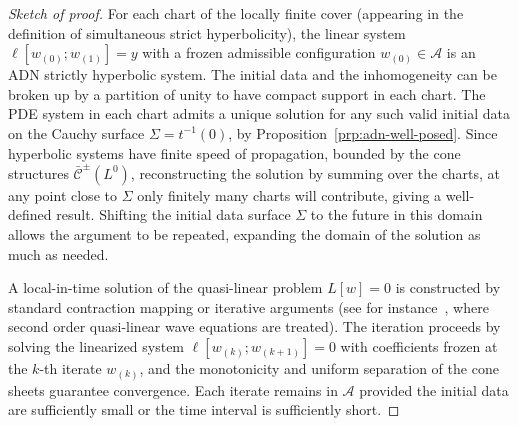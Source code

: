 \documentclass[a4paper]{article}
\theoremstyle{remark}
\begin{document}
\begin{proof}[Sketch of proof]
For each chart of the locally finite cover (appearing in the definition of
simultaneous strict hyperbolicity), the linear system $\ell[w_{(0)};w_{(1)}]
= y$ with a frozen admissible configuration $w_{(0)} \in \mathcal{A}$ is an
ADN strictly hyperbolic system. The initial data and the inhomogeneity can be
broken up by a partition of unity to have compact support in each chart. The
PDE system in each chart admits a unique solution for any such valid initial
data on the Cauchy surface $\Sigma = t^{-1}(0)$, by
Proposition~\ref{prp:adn-well-posed}. Since hyperbolic systems have finite
speed of propagation, bounded by the cone structures
$\bar{\mathcal{C}}^\pm(L^0)$, reconstructing the solution by summing over the
charts, at any point close to $\Sigma$ only finitely many charts will
contribute, giving a well-defined result. Shifting the initial data surface
$\Sigma$ to the future in this domain allows the argument to be repeated,
expanding the domain of the solution as much as needed.

A local-in-time solution of the quasi-linear problem $L[w] = 0$ is constructed
by standard contraction mapping or iterative arguments (see for
instance~\cite[Ch.9]{ringstrom-cauchy}, where second order quasi-linear wave
equations are treated). The iteration proceeds by solving the linearized
system $\ell[w_{(k)};w_{(k+1)}] = 0$ with coefficients frozen at the $k$-th
iterate $w_{(k)}$, and the monotonicity and uniform separation of the cone
sheets guarantee convergence. Each iterate remains in $\mathcal{A}$ provided
the initial data are sufficiently small or the time interval is sufficiently
short.
\end{proof}
\end{document}

